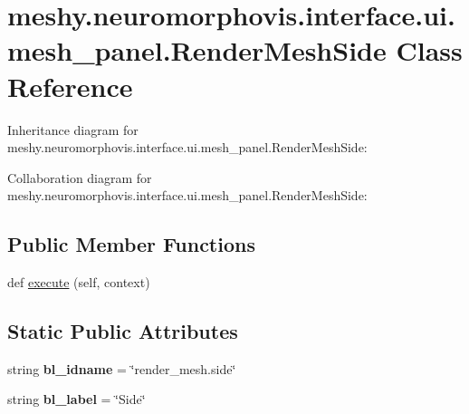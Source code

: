 \hypertarget{classmeshy_1_1neuromorphovis_1_1interface_1_1ui_1_1mesh__panel_1_1RenderMeshSide}{}\section{meshy.\+neuromorphovis.\+interface.\+ui.\+mesh\+\_\+panel.\+Render\+Mesh\+Side Class Reference}
\label{classmeshy_1_1neuromorphovis_1_1interface_1_1ui_1_1mesh__panel_1_1RenderMeshSide}


Inheritance diagram for meshy.\+neuromorphovis.\+interface.\+ui.\+mesh\+\_\+panel.\+Render\+Mesh\+Side\+:


Collaboration diagram for meshy.\+neuromorphovis.\+interface.\+ui.\+mesh\+\_\+panel.\+Render\+Mesh\+Side\+:
\subsection*{Public Member Functions}
\begin{DoxyCompactItemize}
\item 
def \hyperlink{classmeshy_1_1neuromorphovis_1_1interface_1_1ui_1_1mesh__panel_1_1RenderMeshSide_a7ffbdcba3eb2644a73f775702a18362d}{execute} (self, context)
\end{DoxyCompactItemize}
\subsection*{Static Public Attributes}
\begin{DoxyCompactItemize}
\item 
string {\bfseries bl\+\_\+idname} = \char`\"{}render\+\_\+mesh.\+side\char`\"{}\hypertarget{classmeshy_1_1neuromorphovis_1_1interface_1_1ui_1_1mesh__panel_1_1RenderMeshSide_a37699eb0d405fead79e1a74488e675fa}{}\label{classmeshy_1_1neuromorphovis_1_1interface_1_1ui_1_1mesh__panel_1_1RenderMeshSide_a37699eb0d405fead79e1a74488e675fa}

\item 
string {\bfseries bl\+\_\+label} = \char`\"{}Side\char`\"{}\hypertarget{classmeshy_1_1neuromorphovis_1_1interface_1_1ui_1_1mesh__panel_1_1RenderMeshSide_a005eb47828754126b9fcebaae979ca07}{}\label{classmeshy_1_1neuromorphovis_1_1interface_1_1ui_1_1mesh__panel_1_1RenderMeshSide_a005eb47828754126b9fcebaae979ca07}

\end{DoxyCompactItemize}


